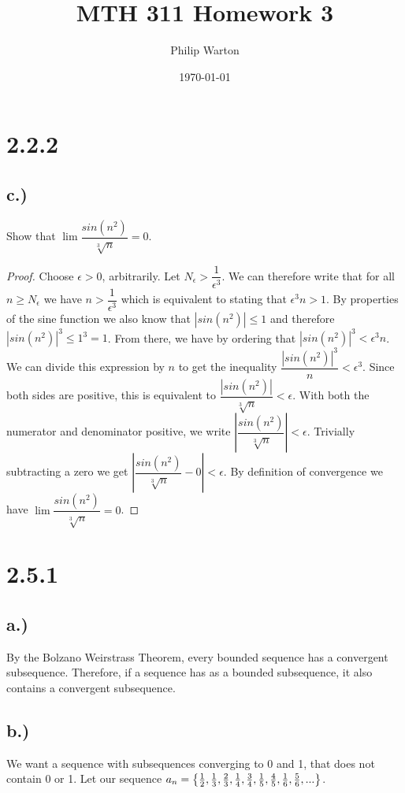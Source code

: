 \documentclass{article}
\begin{document}
\title{MTH 311 Homework 3}
\author{Philip Warton}
\date{\today}
\maketitle

\section*{2.2.2}
	\subsection*{c.)}
		Show that $\lim \dfrac{sin(n^2)}{\sqrt[3]{n}} = 0$.
		\begin{proof}
			Choose $\epsilon > 0$, arbitrarily. Let $N_\epsilon > \dfrac{1}{\epsilon^3}$.
			We can therefore write that for all $n \geqslant N_\epsilon$ we have $n > \dfrac{1}{\epsilon^3}$ which is equivalent to stating that $\epsilon^3n > 1$.
			By properties of the sine function we also know that $|sin(n^2)| \leqslant 1$ and therefore $|sin(n^2)|^3 \leqslant 1^3 = 1$.
			From there, we have by ordering that $|sin(n^2)|^3 < \epsilon^3n$.
			We can divide this expression by $n$ to get the inequality $\dfrac{|sin(n^2)|^3}{n} < \epsilon^3$.
			Since both sides are positive, this is equivalent to $\dfrac{|sin(n^2)|}{\sqrt[3]{n}} < \epsilon$.
			With both the numerator and denominator positive, we write $\left| \dfrac{sin(n^2)}{\sqrt[3]{n}} \right| < \epsilon$.
			Trivially subtracting a zero we get $\left| \dfrac{sin(n^2)}{\sqrt[3]{n}} - 0\right| < \epsilon$.
			By definition of convergence we have $\lim \dfrac{sin(n^2)}{\sqrt[3]{n}} = 0$.
	
		\end{proof}

\section*{2.5.1}
	\subsection*{a.)}
		By the Bolzano Weirstrass Theorem, every bounded sequence has a convergent subsequence.
		Therefore, if a sequence has as a bounded subsequence, it also contains a convergent subsequence.
	\subsection*{b.)}
		We want a sequence with subsequences converging to 0 and 1, that does not contain 0 or 1.
		Let our sequence $\large{a_n = \left\{ \frac{1}{2}, \frac{1}{3}, \frac{2}{3}, \frac{1}{4}, \frac{3}{4}, \frac{1}{5}, \frac{4}{5}, \frac{1}{6}, \frac{5}{6}, ... \right\}}$.
\end{document}
